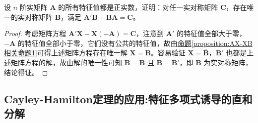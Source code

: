 \documentclass[../../main.tex]{subfiles}%
\begin{document}
\begin{example}
设 \(n\) 阶实矩阵 \(\boldsymbol{A}\) 的所有特征值都是正实数，证明：对任一实对称矩阵 \(\boldsymbol{C}\)，存在唯一的实对称矩阵 \(\boldsymbol{B}\)，满足 \(\boldsymbol{A}'\boldsymbol{B} + \boldsymbol{B}\boldsymbol{A} = \boldsymbol{C}\)。
\end{example}
\begin{proof}
考虑矩阵方程 \(\boldsymbol{A}'\boldsymbol{X} - \boldsymbol{X}(-\boldsymbol{A}) = \boldsymbol{C}\)，注意到 \(\boldsymbol{A}'\) 的特征值全部大于零，\(-\boldsymbol{A}\) 的特征值全部小于零，它们没有公共的特征值，故由\hyperref[proposition:AX-XB相关命题1]{命题\ref{proposition:AX-XB相关命题1}}可得上述矩阵方程存在唯一解 \(\boldsymbol{X = B}\)。容易验证 \(\boldsymbol{X = \overline{B}}\)，\(\boldsymbol{B}'\) 也都是上述矩阵方程的解，故由解的唯一性可知 \(\boldsymbol{B = \overline{B}}\) 且 \(\boldsymbol{B = B'}\)，即 \(\boldsymbol{B}\) 为实对称矩阵，结论得证。
\end{proof}


\subsection{Cayley-Hamilton定理的应用:特征多项式诱导的直和分解}
\end{document}
